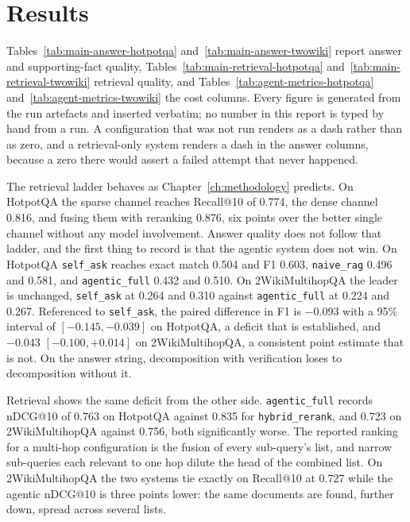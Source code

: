 \section{Results}
\label{sec:results}




Tables~\ref{tab:main-answer-hotpotqa} and~\ref{tab:main-answer-twowiki}
report answer and supporting-fact quality,
Tables~\ref{tab:main-retrieval-hotpotqa} and~\ref{tab:main-retrieval-twowiki}
retrieval quality, and Tables~\ref{tab:agent-metrics-hotpotqa}
and~\ref{tab:agent-metrics-twowiki} the cost columns. Every figure is
generated from the run artefacts and inserted verbatim; no number in this
report is typed by hand from a run. A configuration that was not run renders
as a dash rather than as zero, and a retrieval-only system renders a dash in
the answer columns, because a zero there would assert a failed attempt that
never happened.

The retrieval ladder behaves as Chapter~\ref{ch:methodology} predicts. On
HotpotQA the sparse channel reaches Recall@10 of 0.774, the dense channel
0.816, and fusing them with reranking 0.876, six points over the better single
channel without any model involvement. Answer quality does not follow that
ladder, and the first thing to record is that the agentic system does not win.
On HotpotQA \texttt{self\_ask} reaches exact match 0.504 and F1 0.603,
\texttt{naive\_rag} 0.496 and 0.581, and \texttt{agentic\_full} 0.432 and
0.510. On 2WikiMultihopQA the leader is unchanged, \texttt{self\_ask} at 0.264
and 0.310 against \texttt{agentic\_full} at 0.224 and 0.267. Referenced to
\texttt{self\_ask}, the paired difference in F1 is $-0.093$ with a 95\%
interval of $[-0.145, -0.039]$ on HotpotQA, a deficit that is established, and
$-0.043$ $[-0.100, +0.014]$ on 2WikiMultihopQA, a consistent point estimate
that is not. On the answer string, decomposition with verification loses to
decomposition without it.

Retrieval shows the same deficit from the other side. \texttt{agentic\_full}
records nDCG@10 of 0.763 on HotpotQA against 0.835 for \texttt{hybrid\_rerank},
and 0.723 on 2WikiMultihopQA against 0.756, both significantly worse. The
reported ranking for a multi-hop configuration is the fusion of every
sub-query's list, and narrow sub-queries each relevant to one hop dilute the
head of the combined list. On 2WikiMultihopQA the two systems tie exactly on
Recall@10 at 0.727 while the agentic nDCG@10 is three points lower: the same
documents are found, further down, spread across several lists.

